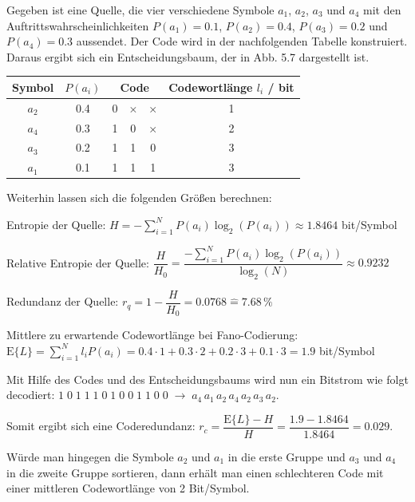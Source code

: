 \begin{beispiel}
Gegeben ist eine Quelle, die vier verschiedene Symbole $a_1$, $a_2$, $a_3$ und $a_4$ mit den Auftrittswahrscheinlichkeiten $P(a_1) = 0.1$, $P(a_2) = 0.4$, $P(a_3) = 0.2$ und $P(a_4) = 0.3$ aussendet. Der Code wird in der nachfolgenden Tabelle konstruiert. Daraus ergibt sich ein Entscheidungsbaum, der in Abb. 5.7 dargestellt ist.

\begin{center}
\begin{tabular}{c|c|ccc|c}
Symbol & $P(a_i)$ & \multicolumn{3}{c|}{Code} & Codewortlänge $l_i$ / bit \\
\hline
$a_2$ & 0.4 & 0 & $\times$ & $\times$ & 1 \\
$a_4$ & 0.3 & 1 & 0 & $\times$ & 2 \\
$a_3$ & 0.2 & 1 & 1 & 0       & 3 \\
$a_1$ & 0.1 & 1 & 1 & 1       & 3 \\
\end{tabular}
\end{center}

Weiterhin lassen sich die folgenden Größen berechnen:

Entropie der Quelle: $H = -\sum_{i=1}^{N} P(a_i)\log_2(P(a_i)) \approx 1.8464$ bit/Symbol

Relative Entropie der Quelle: $\dfrac{H}{H_0} = \dfrac{-\sum_{i=1}^{N} P(a_i)\log_2(P(a_i))}{\log_2(N)} \approx 0.9232$

Redundanz der Quelle: $r_q = 1 - \dfrac{H}{H_0} = 0.0768 \mathrel{\widehat{=}} 7.68\,\%$

Mittlere zu erwartende Codewortlänge bei Fano-Codierung:
$\mathrm{E}\{L\} = \sum_{i=1}^{N} l_i P(a_i) = 0.4 \cdot 1 + 0.3 \cdot 2 + 0.2 \cdot 3 + 0.1 \cdot 3 = 1.9$ bit/Symbol

Mit Hilfe des Codes und des Entscheidungsbaums wird nun ein Bitstrom wie folgt decodiert:
$1\;0\;1\;1\;1\;0\;1\;0\;0\;1\;1\;0\;0 \;\rightarrow\; a_4\,a_1\,a_2\,a_4\,a_2\,a_3\,a_2$.

Somit ergibt sich eine Coderedundanz: $r_c = \dfrac{\mathrm{E}\{L\} - H}{H} = \dfrac{1.9 - 1.8464}{1.8464} = 0.029$.

\end{beispiel}

Würde man hingegen die Symbole $a_2$ und $a_1$ in die erste Gruppe und $a_3$ und $a_4$ in die zweite Gruppe sortieren, dann erhält man einen schlechteren Code mit einer mittleren Codewortlänge von 2 Bit/Symbol.

